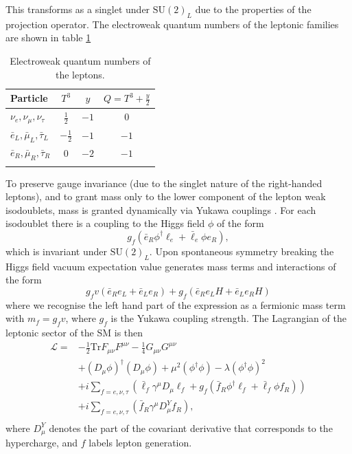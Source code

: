 This transforms as a singlet under $\mathrm{SU}(2)_{L}$ due to the properties of the projection operator. The electroweak quantum numbers of the leptonic families are shown in table \ref{tab:theory:elecroweak_qn_leptons}
\begin{table}[h!]
    \centering
\renewcommand{\arraystretch}{1.3}
\begin{tabular}{ l | c c c }
    \thickhline
    Particle & $T^{3}$ & $y$ & $Q = T^3 + \frac{y}{2}$ \\
    \hline
    $\nu_{e},\nu_{\mu},\nu_{\tau}$  & $\frac{1}{2} $ & $-1$ & $0$ \\
    $\bar{e}_{L},\bar{\mu}_{L},\bar{\tau}_{L}$  & $-\frac{1}{2} $ & $-1$ & $-1$ \\
    $\bar{e}_{R},\bar{\mu}_{R},\bar{\tau}_{R}$  & $0$  & $-2$ & $-1$ \\
    \thickhline
\end{tabular}%
\caption{Electroweak quantum numbers of the leptons.}
 \label{tab:theory:elecroweak_qn_leptons}
\end{table}

To preserve gauge invariance (due to the singlet nature of the right-handed leptons), and to grant mass only to the lower component of the lepton weak isodoublets, mass is granted dynamically via Yukawa couplings \cite{Maggiore}. For each isodoublet there is a coupling to the Higgs field $\phi$ of the form
\begin{equation}
    \label{eq:theory:lepton_yukawa}
    g_{f}(\bar{e}_{R}\phi^{\dag}\ell_{e} + \bar{\ell}_{e}\phi{e}_{R}),
\end{equation}
which is invariant under $\mathrm{SU}(2)_{L}$. Upon spontaneous symmetry breaking the Higgs field vacuum expectation value generates mass terms and interactions of the form
\begin{equation}
    \label{eq:theory:lepton_mass_higgs_int}
    g_{f}v(\bar{e}_{R}e_{L} + \bar{e}_{L}e_{R}) + g_{f}(\bar{e}_{R}e_{L}H + \bar{e}_{L}e_{R}H)
\end{equation}
where we recognise the left hand part of the expression as a fermionic mass term with $m_{f} = g_{f}v$, where $g_f$ is the Yukawa coupling strength. The Lagrangian of the leptonic sector of the SM is then
\begin{equation}
    \begin{split}
    \mathcal{L} =& -\frac{1}{2}\mathrm{Tr}F_{\mu\nu}F^{\mu\nu} - \frac{1}{4}G_{\mu\nu}G^{\mu\nu} \\
                 &+ (D_{\mu}\phi)^{\dag}(D_{\mu}\phi) + \mu^{2}(\phi^{\dag}\phi) - \lambda(\phi^{\dag}\phi)^{2} \\
                 &+ i\sum_{f=e,\nu,\tau}(\bar{\ell}_{f}\gamma^{\mu}D_{\mu}\ell_{f} + g_{f}(\bar{f}_{R}\phi^{\dag}\ell_{f} + \bar{\ell}_{f}\phi{f}_{R})) \\
                 &+ i\sum_{f=e,\nu,\tau}(\bar{f}_{R}\gamma^{\mu}D^{Y}_{\mu}f_{R}), \\
    \end{split}
\end{equation}
where $D^{Y}_{\mu}$ denotes the part of the covariant derivative that corresponds to the hypercharge, and $f$ labels lepton generation. 

